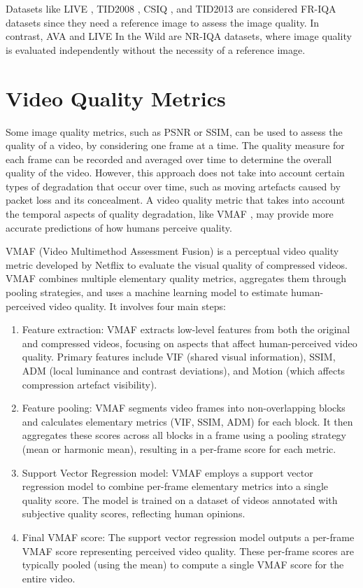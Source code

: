 Datasets like LIVE \cite{sheikh2006statistical}, TID2008 \cite{ponomarenko2009tid2008}, CSIQ \cite{larson2010most}, and TID2013 \cite{ponomarenko2013color} are considered FR-IQA datasets since they need a reference image to assess the image quality. In contrast, AVA \cite{murray2012ava} and LIVE In the Wild \cite{ghadiyaram2015massive} are NR-IQA datasets, where image quality is evaluated independently without the necessity of a reference image.

\section{Video Quality Metrics}
\label{sec:video-quality-metrics}

Some image quality metrics, such as PSNR or SSIM, can be used to assess the quality of a video, by considering one frame at a time. The quality measure for each frame can be recorded and averaged over time to determine the overall quality of the video. However, this approach does not take into account certain types of degradation that occur over time, such as moving artefacts caused by packet loss and its concealment. A video quality metric that takes into account the temporal aspects of quality degradation, like VMAF \cite{li2018vmaf}, may provide more accurate predictions of how humans perceive quality.

VMAF (Video Multimethod Assessment Fusion) is a perceptual video quality metric developed by Netflix to evaluate the visual quality of compressed videos. VMAF combines multiple elementary quality metrics, aggregates them through pooling strategies, and uses a machine learning model to estimate human-perceived video quality. It involves four main steps:
\begin{enumerate}
    \item Feature extraction: VMAF extracts low-level features from both the original and compressed videos, focusing on aspects that affect human-perceived video quality. Primary features include VIF (shared visual information), SSIM, ADM (local luminance and contrast deviations), and Motion (which affects compression artefact visibility).
    \item Feature pooling: VMAF segments video frames into non-overlapping blocks and calculates elementary metrics (VIF, SSIM, ADM) for each block. It then aggregates these scores across all blocks in a frame using a pooling strategy (mean or harmonic mean), resulting in a per-frame score for each metric.
    \item Support Vector Regression model: VMAF employs a support vector regression model to combine per-frame elementary metrics into a single quality score. The model is trained on a dataset of videos annotated with subjective quality scores, reflecting human opinions.
    \item Final VMAF score: The support vector regression model outputs a per-frame VMAF score representing perceived video quality. These per-frame scores are typically pooled (using the mean) to compute a single VMAF score for the entire video.
\end{enumerate}

